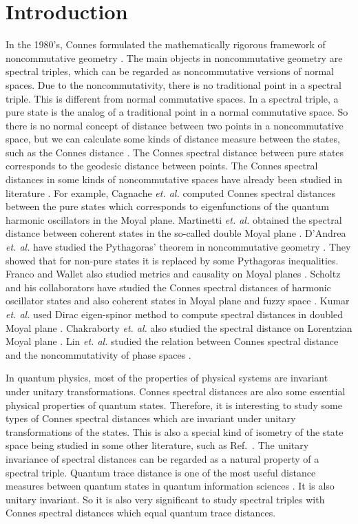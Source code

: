 \documentclass[a4paper,12pt]{article}
\begin{document}
\section{Introduction}
In the 1980’s, Connes formulated the mathematically rigorous framework of noncommutative geometry \cite{Connes}.
The main objects in noncommutative geometry are spectral triples, which can be regarded as noncommutative versions of normal spaces.
Due to the noncommutativity, there is no traditional point in a spectral triple. This is different from normal commutative spaces.
In a spectral triple, a pure state is the
analog of a traditional point in a normal commutative space.
So there is no normal concept of distance between two points in a noncommutative space, but
we can calculate some kinds of distance measure between the states, such as the
Connes distance \cite{Connes1}.
The Connes spectral distance between pure states corresponds to the geodesic distance
between points.
The Connes spectral distances in some kinds
of noncommutative spaces have already been studied in literature
\cite{Bimonte,Dai,Cagnache,Wallet,Martinetti1,Martinetti,DAndrea,Pythagoras,Pythagoras1,Franco,Scholtz,Chaoba,Revisiting,Kumar,Barrett,Chakraborty,Lin1,Lin2,Clare}.
For example, Cagnache \textit{et. al.} computed
Connes spectral distances between the pure states which corresponds to
eigenfunctions of the quantum harmonic oscillators in the Moyal
plane\cite{Cagnache}. Martinetti \textit{et. al.} obtained the
spectral distance between coherent states in the so-called double Moyal plane
\cite{Martinetti}. D’Andrea \textit{et. al.} have studied the Pythagoras’
theorem in noncommutative geometry \cite{Pythagoras}. They showed that for non-pure states
it is replaced by some Pythagoras inequalities. Franco and Wallet also studied
metrics and causality on Moyal planes \cite{Franco}. Scholtz and his collaborators have studied the Connes
spectral distances of harmonic oscillator states and also coherent states in
Moyal plane and fuzzy space \cite{Scholtz,Chaoba,Revisiting}.
Kumar \textit{et. al.} used Dirac eigen-spinor method to compute spectral distances in doubled Moyal plane \cite{Kumar}. Chakraborty \textit{et. al.} also studied the spectral
distance on Lorentzian Moyal plane \cite{Chakraborty}.
Lin \textit{et. al.} studied the relation between Connes spectral
distance and the noncommutativity of phase spaces \cite{Lin2}.

In quantum physics, most of the properties of physical systems are invariant
under unitary transformations. Connes spectral distances are also some essential
physical properties of quantum states. Therefore, it is interesting to study
some types of Connes spectral distances which are invariant under unitary transformations of the states.
This is also a special kind of isometry of the state space being studied in some other literature, such as Ref.~\cite{Martinettip}.
The unitary invariance of spectral distances can be regarded as a natural property of a spectral triple.
Quantum trace distance is one of the most useful distance measures between
quantum states in quantum information sciences \cite{Nielsen}. It is also unitary invariant.
So it is also very significant to study spectral triples with Connes spectral
distances which equal quantum trace distances.
\end{document}

